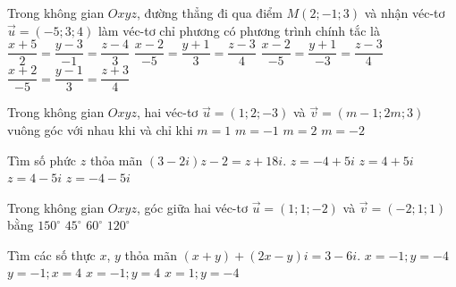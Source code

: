 \begin{ex}%
	Trong không gian $Oxyz$, đường thẳng đi qua điểm $M(2;-1;3)$ và nhận véc-tơ $\overrightarrow{u}=(-5;3;4)$ làm véc-tơ chỉ phương có phương trình chính tắc là
	\choice
	{$\dfrac{x+5}{2}=\dfrac{y-3}{-1}=\dfrac{z-4}{3}$}
	{\True $\dfrac{x-2}{-5}=\dfrac{y+1}{3}=\dfrac{z-3}{4}$}
	{$\dfrac{x-2}{-5}=\dfrac{y+1}{-3}=\dfrac{z-3}{4}$}
	{$\dfrac{x+2}{-5}=\dfrac{y-1}{3}=\dfrac{z+3}{4}$}
\end{ex}
\begin{ex}%
	Trong không gian $Oxyz$, hai véc-tơ $\overrightarrow{u}=(1;2;-3)$ và $\overrightarrow{v}=(m-1;2m;3)$ vuông góc với nhau khi và chỉ khi
	\choice
	{$m=1$}
	{$m=-1$}
	{\True $m=2$}
	{$m=-2$}
\end{ex}
\begin{ex}%
	Tìm số phức $z$ thỏa mãn $(3-2i)z-2=z+18i$.
	\choice
	{\True $z=-4+5i$}
	{$z=4+5i$}
	{$z=4-5i$}
	{$z=-4-5i$}
\end{ex}
\begin{ex}%
	Trong không gian $Oxyz$, góc giữa hai véc-tơ $\overrightarrow{u}=\left(1; 1;-2\right)$ và $\overrightarrow{v}=\left(-2; 1; 1\right)$ bằng
	\choice
	{$150^{\circ}$}
	{$45^{\circ}$}
	{$60^{\circ}$}
	{\True $120^{\circ}$}
\end{ex}
\begin{ex}%
	Tìm các số thực $x$, $y$ thỏa mãn $(x+y)+(2x-y)i=3-6i$.
	\choice
	{$x=-1;y=-4$}
	{$y=-1;x=4$}
	{\True $x=-1;y=4$}
	{$x=1;y=-4$}
\end{ex}
